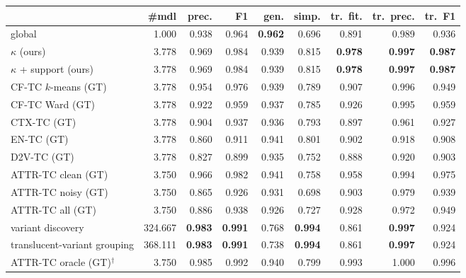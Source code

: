 \begin{tabular}{lrrrrrrrr}
\toprule
 & \#mdl & prec. & F1 & gen. & simp. & tr.\ fit. & tr.\ prec. & tr.\ F1 \\
\midrule
global & 1.000 & 0.938 & 0.964 & \textbf{0.962} & 0.696 & 0.891 & 0.989 & 0.936 \\
$\kappa$ (ours) & 3.778 & 0.969 & 0.984 & 0.939 & 0.815 & \textbf{0.978} & \textbf{0.997} & \textbf{0.987} \\
$\kappa$ + support (ours) & 3.778 & 0.969 & 0.984 & 0.939 & 0.815 & \textbf{0.978} & \textbf{0.997} & \textbf{0.987} \\
CF-TC $k$-means (GT) & 3.778 & 0.954 & 0.976 & 0.939 & 0.789 & 0.907 & 0.996 & 0.949 \\
CF-TC Ward (GT) & 3.778 & 0.922 & 0.959 & 0.937 & 0.785 & 0.926 & 0.995 & 0.959 \\
CTX-TC (GT) & 3.778 & 0.904 & 0.937 & 0.936 & 0.793 & 0.897 & 0.961 & 0.927 \\
EN-TC (GT) & 3.778 & 0.860 & 0.911 & 0.941 & 0.801 & 0.902 & 0.918 & 0.908 \\
D2V-TC (GT) & 3.778 & 0.827 & 0.899 & 0.935 & 0.752 & 0.888 & 0.920 & 0.903 \\
ATTR-TC clean (GT) & 3.750 & 0.966 & 0.982 & 0.941 & 0.758 & 0.958 & 0.994 & 0.975 \\
ATTR-TC noisy (GT) & 3.750 & 0.865 & 0.926 & 0.931 & 0.698 & 0.903 & 0.979 & 0.939 \\
ATTR-TC all (GT) & 3.750 & 0.886 & 0.938 & 0.926 & 0.727 & 0.928 & 0.972 & 0.949 \\
variant discovery & 324.667 & \textbf{0.983} & \textbf{0.991} & 0.768 & \textbf{0.994} & 0.861 & \textbf{0.997} & 0.924 \\
translucent-variant grouping & 368.111 & \textbf{0.983} & \textbf{0.991} & 0.738 & \textbf{0.994} & 0.861 & \textbf{0.997} & 0.924 \\
ATTR-TC oracle (GT)$^{\dagger}$ & 3.750 & 0.985 & 0.992 & 0.940 & 0.799 & 0.993 & 1.000 & 0.996 \\
\bottomrule
\end{tabular}

